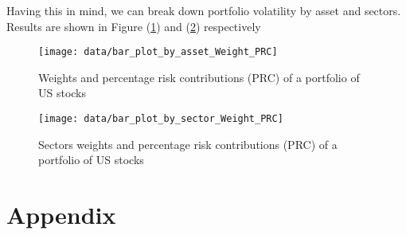\documentclass[12pt, a4paper]{article}
\theoremstyle{problemstyle}
\begin{document}
Having this in mind, we can break down portfolio volatility by asset and sectors. Results are shown in Figure (\ref{fig:histo_by_asset}) and (\ref{fig:histo_by_sector}) respectively

\begin{figure}[H]
	\centering
	\texttt{[image: data/bar\_plot\_by\_asset\_Weight\_PRC]}
	\caption{Weights and percentage risk contributions (PRC) of a portfolio of US stocks}
	\label{fig:histo_by_asset}
\end{figure}
\begin{figure}[H]
 	\centering
 	\texttt{[image: data/bar\_plot\_by\_sector\_Weight\_PRC]}
 	\caption{Sectors weights and percentage risk contributions (PRC) of a portfolio of US stocks}
 	\label{fig:histo_by_sector}
 \end{figure}
 





\appendix
\section{Appendix}
\end{document}
